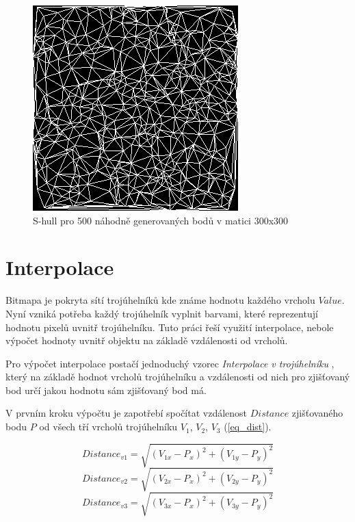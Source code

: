 \documentclass[czech,bachelor,dept460,male,csharp,cpdeclaration]{diploma}
\begin{document}
	\begin{figure}[h]
		\centering
		\includegraphics{Data/bmp_triangulace.png}
		\caption{S-hull pro 500 náhodně generovaných bodů v matici 300x300}
	\end{figure}
	
	\section{Interpolace}
	
	Bitmapa je pokryta sítí trojúhelníků kde známe hodnotu každého vrcholu $Value$. Nyní vzniká potřeba každý trojúhelník vyplnit barvami, které reprezentují hodnotu pixelů uvnitř trojúhelníku. Tuto práci řeší využití interpolace, nebole výpočet hodnoty uvnitř objektu na základě vzdálenosti od vrcholů.
	
	Pro výpočet interpolace postačí jednoduchý vzorec \emph{Interpolace v trojúhelníku} \cite{interp}, který na základě hodnot vrcholů trojúhelníku a vzdálenosti od nich pro zjišťovaný bod určí jakou hodnotu sám zjišťovaný bod má.
	
	
	V prvním kroku výpočtu je zapotřebí spočítat vzdálenost $Distance$ zjišťovaného bodu $P$ od všech tří vrcholů trojúhelníku $V_1$, $V_2$, $V_3$ (\ref{eq_dist}). 
	
	\begin{displaymath}
		Distance_{v1} =\sqrt{(V_{1x}-P_x)^2+(V_{1y}-P_y)^2}
	\end{displaymath}
	\begin{displaymath}
		Distance_{v2} =\sqrt{(V_{2x}-P_x)^2+(V_{2y}-P_y)^2}
	\end{displaymath}
	\begin{equation}\label{eq_dist}
		Distance_{v3} =\sqrt{(V_{3x}-P_x)^2+(V_{3y}-P_y)^2}
	\end{equation}
	
\end{document}
